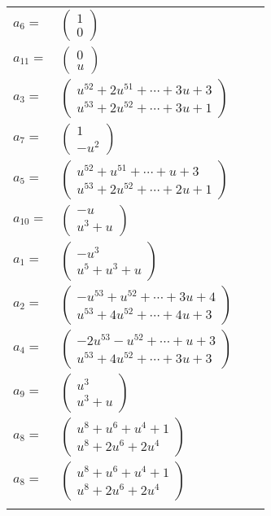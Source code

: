 \documentclass[1p]{elsarticle_modified}
\theoremstyle{definition}
\begin{document}
\begin{tabular}{m{7pt} m{180pt} m{7pt} m{180pt} }
\flushright $a_{6}=$&$\begin{pmatrix}1\\0\end{pmatrix}$ \\
\flushright $a_{11}=$&$\begin{pmatrix}0\\u\end{pmatrix}$ \\
\flushright $a_{3}=$&$\begin{pmatrix}u^{52}+2 u^{51}+\cdots+3 u+3\\u^{53}+2 u^{52}+\cdots+3 u+1\end{pmatrix}$ \\
\flushright $a_{7}=$&$\begin{pmatrix}1\\- u^2\end{pmatrix}$ \\
\flushright $a_{5}=$&$\begin{pmatrix}u^{52}+u^{51}+\cdots+u+3\\u^{53}+2 u^{52}+\cdots+2 u+1\end{pmatrix}$ \\
\flushright $a_{10}=$&$\begin{pmatrix}- u\\u^3+u\end{pmatrix}$ \\
\flushright $a_{1}=$&$\begin{pmatrix}- u^3\\u^5+u^3+u\end{pmatrix}$ \\
\flushright $a_{2}=$&$\begin{pmatrix}- u^{53}+u^{52}+\cdots+3 u+4\\u^{53}+4 u^{52}+\cdots+4 u+3\end{pmatrix}$ \\
\flushright $a_{4}=$&$\begin{pmatrix}-2 u^{53}- u^{52}+\cdots+u+3\\u^{53}+4 u^{52}+\cdots+3 u+3\end{pmatrix}$ \\
\flushright $a_{9}=$&$\begin{pmatrix}u^3\\u^3+u\end{pmatrix}$ \\
\flushright $a_{8}=$&$\begin{pmatrix}u^8+u^6+u^4+1\\u^8+2 u^6+2 u^4\end{pmatrix}$\\ \flushright $a_{8}=$&$\begin{pmatrix}u^8+u^6+u^4+1\\u^8+2 u^6+2 u^4\end{pmatrix}$\\&\end{tabular}
\end{document}
